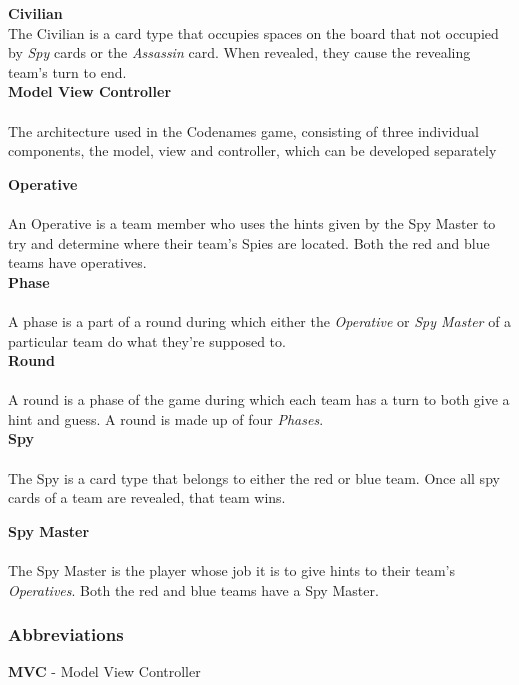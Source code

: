 \documentclass[10pt, a4paper]{article}
\begin{document}
		\textbf{Civilian}\\
		The Civilian is a card type that occupies spaces on the board that not occupied by \textit{Spy} cards or the \textit{Assassin} card. When revealed, they cause the revealing team's turn to end. \\
		
		\textbf{Model View Controller }\\
		\\
		The architecture used in the Codenames game, consisting of three individual components, the model, view and controller, which can be developed separately
		
		\textbf{Operative}\\
		\\
		An Operative is a team member who uses the hints given by the Spy Master to try and determine where their team's Spies are located. Both the red and blue teams have operatives.\\
		
		\textbf{Phase}\\
		\\
		A phase is a part of a round during which either the \textit{Operative} or \textit{Spy Master} of a particular team do what they're supposed to.\\
		
		\textbf{Round}\\
		\\
		A round is a phase of the game during which each team has a turn to both give a hint and guess. A round is made up of four \textit{Phases}.\\
		
		\textbf{Spy}\\
		\\
		The Spy is a card type that belongs to either the red or blue team. Once all spy cards of a team are revealed, that team wins.
				
		\textbf{Spy Master}\\
		\\
		The Spy Master is the player whose job it is to give hints to their team's \textit{Operatives}. Both the red and blue teams have a Spy Master.\\
		
		\subsubsection{Abbreviations}
		
		\textbf{MVC} - Model View Controller
		\\
	
\end{document}
